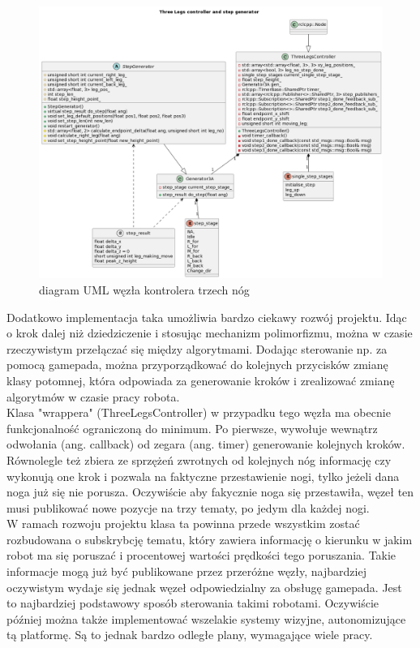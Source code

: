 \begin{figure}[h!]
\includegraphics[width=\textwidth]{UML_diagrams/UML_controller_generator.png}
\centering
\caption{diagram UML węzła kontrolera trzech nóg}
\label{UML_controller_generator}
\end{figure}

Dodatkowo implementacja taka umożliwia bardzo ciekawy rozwój projektu. Idąc o krok dalej niż dziedziczenie i stosując mechanizm polimorfizmu, można w czasie rzeczywistym przełączać się między algorytmami. Dodając sterowanie np. za pomocą gamepada, można przyporządkować do kolejnych przycisków zmianę klasy potomnej, która odpowiada za generowanie kroków i zrealizować zmianę algorytmów w czasie pracy robota.\\

Klasa "wrappera" (ThreeLegsController) w przypadku tego węzła ma obecnie funkcjonalność ograniczoną do minimum. Po pierwsze, wywołuje wewnątrz odwołania (ang. callback) od zegara (ang. timer) generowanie kolejnych kroków. Równolegle też zbiera ze sprzężeń zwrotnych od kolejnych nóg informację czy wykonują one krok i pozwala na faktyczne przestawienie nogi, tylko jeżeli dana noga już się nie porusza. Oczywiście aby fakycznie noga się przestawiła, węzeł ten musi publikować nowe pozycje na trzy tematy, po jedym dla każdej nogi.\\

W ramach rozwoju projektu klasa ta powinna przede wszystkim zostać rozbudowana o subskrybcję tematu, który zawiera informację o kierunku w jakim robot ma się poruszać i procentowej wartości prędkości tego poruszania. Takie informacje mogą już być publikowane przez przeróżne węzły, najbardziej oczywistym wydaje się jednak węzeł odpowiedzialny za obsługę gamepada. Jest to najbardziej podstawowy sposób sterowania takimi robotami. Oczywiście później można także implementować wszelakie systemy wizyjne, autonomizujące tą platformę. Są to jednak bardzo odległe plany, wymagające wiele pracy.

